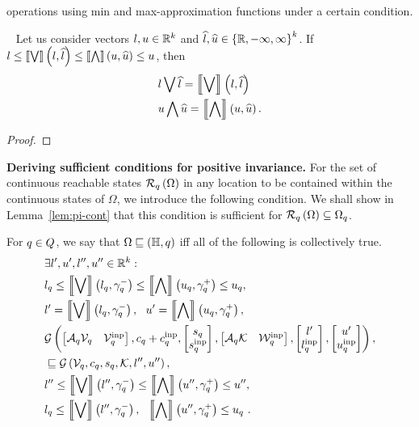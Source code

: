 operations using min and max-approximation functions under a certain
condition.
%
\begin{lemma}~\label{lem:min-max-approximation}
Let us consider vectors $l,u\in\mathbb{R}^k$ and
$\widehat{l},\widehat{u}\in\left\{\mathbb{R},-\infty,\infty\right\}^k$.  If
$l\leq\left\llbracket\bigvee\right\rrbracket\left(l,\widehat{l}\right)\leq\left\llbracket\bigwedge\right\rrbracket\left(u,\widehat{u}\right)\leq u$, then
%
\begin{align*}
& l\bigvee \widehat{l}=\left\llbracket\bigvee\right\rrbracket\left(l,\widehat{l}\right)\\
& u\bigwedge \widehat{u}=\left\llbracket\bigwedge\right\rrbracket\left(u,\widehat{u}\right).
\end{align*}
%
\end{lemma}
%
\begin{proof}

\end{proof}
%
{\bf Deriving sufficient conditions for positive invariance.}  For the
set of continuous reachable states $\mathcal{R}_{q}\left(\Omega\right)$ in any
location to be contained within the continuous states of $\Omega$, we
introduce the following condition.  We shall show in
Lemma~\ref{lem:pi-cont} that this
condition is sufficient for
$\mathcal{R}_{q}\left(\Omega\right)\subseteq\Omega_q$.
%
\begin{definition}
  For $q\in Q$, we say that
  $\Omega\sqsubseteq\left(\mathbb{H},q\right)$ iff  all of the following is
  collectively true.
%
\begin{align}
& \exists l^\prime,u^\prime,l^{\prime\prime},u^{\prime\prime}\in\mathbb{R}^k:\nonumber\\
& l_q\leq\left\llbracket\bigvee\right\rrbracket\left(l_q,\gamma_q^-\right)\leq\left\llbracket\bigwedge\right\rrbracket\left(u_q,\gamma_q^+\right)\leq u_{q},~\label{eqn:continv1}\\
& l^\prime= \left\llbracket\bigvee\right\rrbracket\left(l_q,\gamma_q^-\right),~~u^\prime= \left\llbracket\bigwedge\right\rrbracket\left(u_q,\gamma_q^+\right),~\label{eqn:continv2}\\
& \mathcal{G}\left(
\left[\begin{matrix}\mathcal{A}_q\mathcal{V}_q & \mathcal{V}^{\operatorname{inp}}_q\end{matrix}\right]
,
c_q+c^{\operatorname{inp}}_q
,
\left[\begin{matrix}s_q\\ s^{\operatorname{inp}}_q\end{matrix}\right]
,
\left[\begin{matrix}\mathcal{A}_q\mathcal{K} & \mathcal{W}^{\operatorname{inp}}_q\end{matrix}\right]
,
\left[\begin{matrix}l^\prime\\l^{\operatorname{inp}}_q\end{matrix}\right]
,
\left[\begin{matrix}u^\prime\\ u^{\operatorname{inp}}_q\end{matrix}\right]
\right),\nonumber\\
& \sqsubseteq 
\mathcal{G}\left(\mathcal{V}_q,c_q,s_q,\mathcal{K},l^{\prime\prime},u^{\prime\prime}\right),~\label{eqn:continv3}\\
&
l^{\prime\prime}\leq\left\llbracket\bigvee\right\rrbracket\left(l^{\prime\prime},\gamma_q^-\right)\leq\left\llbracket\bigwedge\right\rrbracket\left(u^{\prime\prime},\gamma_q^+\right)\leq u^{\prime\prime},~\label{eqn:continv4}\\
& l_q\leq\left\llbracket\bigvee\right\rrbracket\left(l^{\prime\prime},\gamma_q^-\right),~~\left\llbracket\bigwedge\right\rrbracket\left(u^{\prime\prime},\gamma_q^+\right)\leq u_q~\label{eqn:continv5}.
\end{align}
%
\end{definition}
